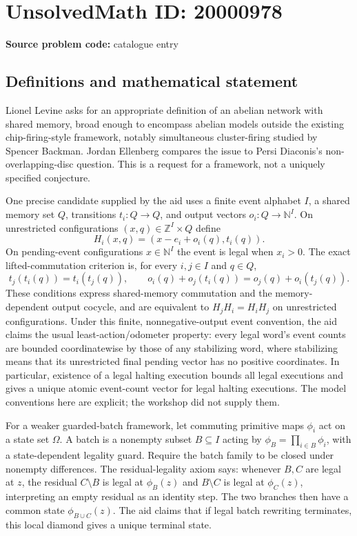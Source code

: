 \documentclass[11pt]{article}
\newcommand{\N}{\mathbb{N}}
\newcommand{\Z}{\mathbb{Z}}
\begin{document}
\section*{UnsolvedMath ID: 20000978}
\textbf{Source problem code:} catalogue entry
\subsection{Definitions and mathematical statement}
Lionel Levine asks for an appropriate definition of an abelian network with shared memory, broad enough to encompass abelian models outside the existing chip-firing-style framework, notably simultaneous cluster-firing studied by Spencer Backman. Jordan Ellenberg compares the issue to Persi Diaconis's non-overlapping-disc question. This is a request for a framework, not a uniquely specified conjecture.

One precise candidate supplied by the aid uses a finite event alphabet $I$, a shared memory set $Q$, transitions $t_i:Q\to Q$, and output vectors $o_i:Q\to\N^I$. On unrestricted configurations $(x,q)\in\Z^I\times Q$ define
\[
 H_i(x,q)=(x-e_i+o_i(q),t_i(q)).
\]
On pending-event configurations $x\in\N^I$ the event is legal when $x_i>0$. The exact lifted-commutation criterion is, for every $i,j\in I$ and $q\in Q$,
\[
 t_j(t_i(q))=t_i(t_j(q)),\qquad
 o_i(q)+o_j(t_i(q))=o_j(q)+o_i(t_j(q)).
\]
These conditions express shared-memory commutation and the memory-dependent output cocycle, and are equivalent to $H_jH_i=H_iH_j$ on unrestricted configurations. Under this finite, nonnegative-output event convention, the aid claims the usual least-action/odometer property: every legal word's event counts are bounded coordinatewise by those of any stabilizing word, where stabilizing means that its unrestricted final pending vector has no positive coordinates. In particular, existence of a legal halting execution bounds all legal executions and gives a unique atomic event-count vector for legal halting executions. The model conventions here are explicit; the workshop did not supply them.

For a weaker guarded-batch framework, let commuting primitive maps $\phi_i$ act on a state set $\Omega$. A batch is a nonempty subset $B\subseteq I$ acting by $\phi_B=\prod_{i\in B}\phi_i$, with a state-dependent legality guard. Require the batch family to be closed under nonempty differences. The residual-legality axiom says: whenever $B,C$ are legal at $z$, the residual $C\setminus B$ is legal at $\phi_B(z)$ and $B\setminus C$ is legal at $\phi_C(z)$, interpreting an empty residual as an identity step. The two branches then have a common state $\phi_{B\cup C}(z)$. The aid claims that if legal batch rewriting terminates, this local diamond gives a unique terminal state.
\end{document}
